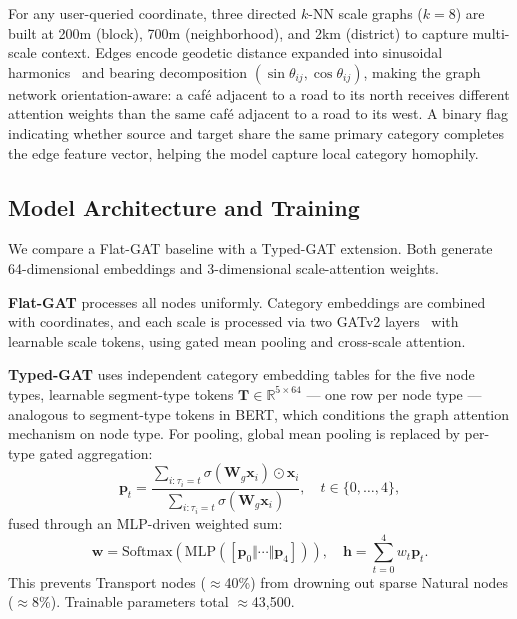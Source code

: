 \documentclass[]{interact}
\theoremstyle{plain}%
\theoremstyle{definition}
\theoremstyle{remark}
\begin{document}
For any user-queried coordinate, three directed $k$-NN scale graphs ($k=8$) are built at 200m (block), 700m (neighborhood), and 2km (district) to capture multi-scale context. Edges encode geodetic distance expanded into sinusoidal harmonics~\citep{vaswani2023attentionneed} and bearing decomposition $(\sin\theta_{ij}, \cos\theta_{ij})$, making the graph network orientation-aware: a caf\'{e} adjacent to a road to its north receives different attention weights than the same caf\'{e} adjacent to a road to its west. A binary flag indicating whether source and target share the same primary category completes the edge feature vector, helping the model capture local category homophily.

\subsection{Model Architecture and Training}
\label{sec:architecture}

We compare a Flat-GAT baseline with a Typed-GAT extension. Both generate 64-dimensional embeddings and 3-dimensional scale-attention weights.

\textbf{Flat-GAT} processes all nodes uniformly. Category embeddings are combined with coordinates, and each scale is processed via two GATv2 layers~\citep{brody2022attentivegraphattentionnetworks} with learnable scale tokens, using gated mean pooling and cross-scale attention.

\textbf{Typed-GAT} uses independent category embedding tables for the five node types, learnable segment-type tokens $\mathbf{T} \in \mathbb{R}^{5 \times 64}$ --- one row per node type --- analogous to segment-type tokens in BERT, which conditions the graph attention mechanism on node type. For pooling, global mean pooling is replaced by per-type gated aggregation:
\begin{equation}
\mathbf{p}_t = \frac{\sum_{i:\tau_i=t} \sigma(\mathbf{W}_g \mathbf{x}_i) \odot \mathbf{x}_i}{\sum_{i:\tau_i=t} \sigma(\mathbf{W}_g \mathbf{x}_i)}, \quad t \in \{0,\ldots,4\},
\label{eq:typepool}
\end{equation}
fused through an MLP-driven weighted sum:
\begin{equation}
\mathbf{w} = \mathrm{Softmax}(\mathrm{MLP}([\mathbf{p}_0 \Vert \cdots \Vert \mathbf{p}_4])), \quad \mathbf{h} = \sum_{t=0}^{4} w_t \mathbf{p}_t.
\label{eq:weightedpool}
\end{equation}
This prevents Transport nodes ($\approx$40\%) from drowning out sparse Natural nodes ($\approx$8\%). Trainable parameters total $\approx$43{,}500.
\end{document}
